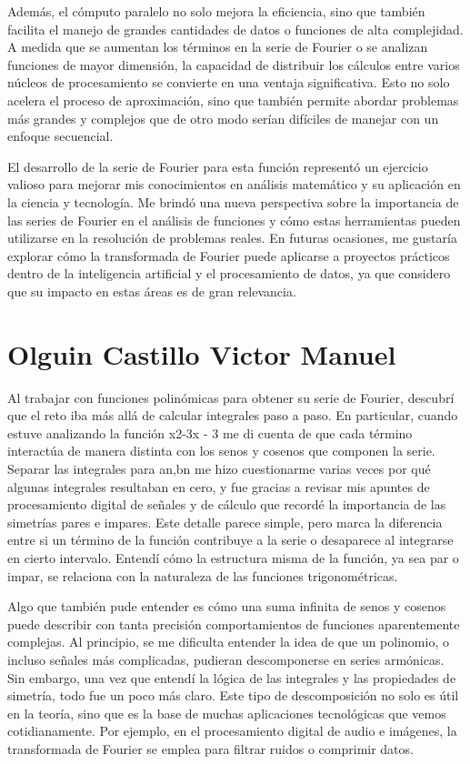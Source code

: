 {Además, el cómputo paralelo no solo mejora la eficiencia, sino que también facilita el manejo de grandes cantidades de datos o funciones de alta complejidad. A medida que se aumentan los términos en la serie de Fourier o se analizan funciones de mayor dimensión, la capacidad de distribuir los cálculos entre varios núcleos de procesamiento se convierte en una ventaja significativa. Esto no solo acelera el proceso de aproximación, sino que también permite abordar problemas más grandes y complejos que de otro modo serían difíciles de manejar con un enfoque secuencial.

El desarrollo de la serie de Fourier para esta función representó un ejercicio valioso para mejorar mis conocimientos en análisis matemático y su aplicación en la ciencia y tecnología. Me brindó una nueva perspectiva sobre la importancia de las series de Fourier en el análisis de funciones y cómo estas herramientas pueden utilizarse en la resolución de problemas reales. En futuras ocasiones, me gustaría explorar cómo la transformada de Fourier puede aplicarse a proyectos prácticos dentro de la inteligencia artificial y el procesamiento de datos, ya que considero que su impacto en estas áreas es de gran relevancia.

\newpage
\section{Olguin Castillo Victor Manuel}

Al trabajar con funciones polinómicas para obtener su serie de Fourier, descubrí que el reto iba más allá de calcular integrales paso a paso. En particular, cuando estuve analizando la función x2-3x - 3 me di cuenta de que cada término interactúa de manera distinta con los senos y cosenos que componen la serie. Separar las integrales para  an,bn me hizo cuestionarme varias veces por qué algunas integrales resultaban en cero, y fue gracias a revisar mis apuntes de procesamiento digital de señales y de cálculo que recordé la importancia de las simetrías pares e impares. Este detalle parece simple, pero marca la diferencia entre si un término de la función contribuye a la serie o desaparece al integrarse en cierto intervalo. Entendí cómo la estructura misma de la función, ya sea par o impar, se relaciona con la naturaleza de las funciones trigonométricas.

Algo que también pude entender es cómo una suma infinita de senos y cosenos puede describir con tanta precisión comportamientos de funciones aparentemente complejas. Al principio, se me dificulta entender la idea de que un polinomio, o incluso señales más complicadas, pudieran descomponerse en series armónicas. Sin embargo, una vez que entendí la lógica de las integrales y las propiedades de simetría, todo fue un poco más claro. Este tipo de descomposición no solo es útil en la teoría, sino que es la base de muchas aplicaciones tecnológicas que vemos cotidianamente. Por ejemplo, en el procesamiento digital de audio e imágenes, la transformada de Fourier se emplea para filtrar ruidos o comprimir datos.

}
